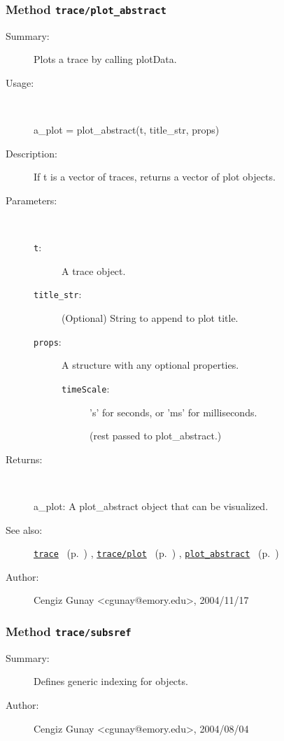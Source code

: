 \subsubsection[Method \texttt{plot\_abstract}]{Method \texttt{trace/plot\_abstract}}%
%
\label{ref_trace__plot_abstract}%
\hypertarget{ref_trace__plot_abstract}{}%
\begin{description}
\item[Summary:]Plots a trace by calling plotData.
%
\item[Usage:]~%
\begin{lyxcode}%
a\_plot = plot\_abstract(t, title\_str, props)
%
\end{lyxcode}%
%
\item[Description:]%
If t is a vector of traces, returns a vector of plot objects.
\item[Parameters:]~
\begin{description}%
\item[\texttt{t}:]
 A trace object.
\item[\texttt{title\_str}:]
 (Optional) String to append to plot title.
\item[\texttt{props}:]
 A structure with any optional properties.
\begin{description}%
\item[\texttt{timeScale}:]
 's' for seconds, or 'ms' for milliseconds.

(rest passed to plot\_abstract.)\end{description}%
\end{description}%
%
\item[Returns:]~

	a\_plot: A plot\_abstract object that can be visualized.
%
%
\item[See also:]%
\hyperlink{ref_trace}{\texttt{trace}}%
\ (p.~\pageref{ref_trace})%
%
, \hyperlink{ref_trace__plot}{\texttt{trace/plot}}%
\ (p.~\pageref{ref_trace__plot})%
%
, \hyperlink{ref_plot_abstract}{\texttt{plot\_abstract}}%
\ (p.~\pageref{ref_plot_abstract})%
%
%
\item[Author:]%
Cengiz Gunay <cgunay@emory.edu>, 2004/11/17%
\end{description}
\methodline%
\subsubsection[Method \texttt{subsref}]{Method \texttt{trace/subsref}}%
%
\label{ref_trace__subsref}%
\hypertarget{ref_trace__subsref}{}%
\begin{description}
\item[Summary:]Defines generic indexing for objects.
%
%
%
%
%
%
%
\item[Author:]%
Cengiz Gunay <cgunay@emory.edu>, 2004/08/04%
\end{description}
\methodline%
